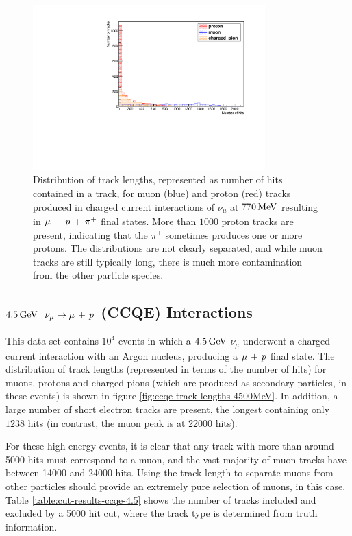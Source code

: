 \begin{figure}
\centering
\includegraphics[angle=-90,width=0.8\textwidth]{chapters/particleid_images/ccpi-770-track-lengths}
\caption[Track length distribution for $\mu$, $p$ and $\pi^+$ from $770\MeV$ neutrinos (\acs{CCPi})]{\label{fig:ccpi-track-lengths-770MeV}Distribution of track lengths, represented as number of hits contained in a track, for muon (blue) and proton (red) tracks produced in charged current interactions of $\nu_\mu$ at $770\MeV$ resulting in $\mu\,+\,p\,+\,\pi^{+}$ final states. More than $1000$ proton tracks are present, indicating that the $\pi^+$ sometimes produces one or more protons. The distributions are not clearly separated, and while muon tracks are still typically long, there is much more contamination from the other particle species.}
\end{figure}

\clearpage
\subsection{$4.5\,\mathrm{GeV}$ $\nu_\mu \rightarrow \mu\,+\,p$ (CCQE) Interactions}
This data set contains $10^4$ events in which a $4.5\,\mathrm{GeV}$ $\nu_\mu$ underwent a charged current interaction with an Argon nucleus, producing a $\mu\,+\,p$ final state. The distribution of track lengths (represented in terms of the number of hits) for muons, protons and charged pions (which are produced as secondary particles, in these events) is shown in figure \ref{fig:ccqe-track-lengths-4500MeV}. In addition, a large number of short electron tracks are present, the longest containing only $1238$ hits (in contrast, the muon peak is at 22000 hits).

For these high energy events, it is clear that any track with more than around 5000 hits must correspond to a muon, and the vast majority of muon tracks have between 14000 and 24000 hits. Using the track length to separate muons from other particles should provide an extremely pure selection of muons, in this case. Table \ref{table:cut-results-ccqe-4.5} shows the number of tracks included and excluded by a 5000 hit cut, where the track type is determined from truth information.

